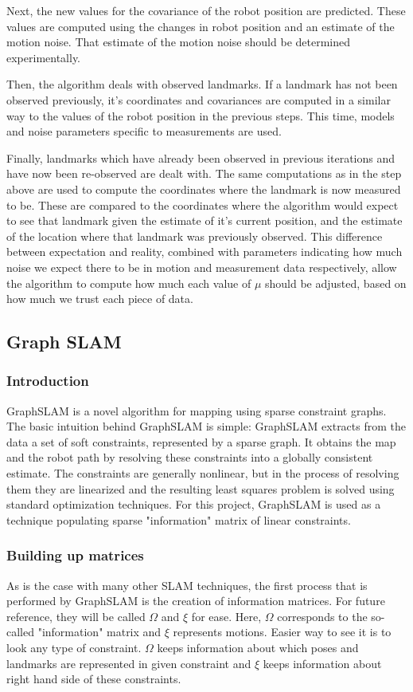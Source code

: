 \documentclass{ba-kecs}
\numberwithin{figure}{section}
\numberwithin{equation}{section}
\begin{document}
Next, the new values for the covariance of the robot position are predicted. These values are computed using the changes in robot position and an estimate of the motion noise. That estimate of the motion noise should be determined experimentally.

Then, the algorithm deals with observed landmarks. If a landmark has not been observed previously, it’s coordinates and covariances are computed in a similar way to the values of the robot position in the previous steps. This time, models and noise parameters specific to measurements are used.

Finally, landmarks which have already been observed in previous iterations and have now been re-observed are dealt with. The same computations as in the step above are used to compute the coordinates where the landmark is now measured to be. These are compared to the coordinates where the algorithm would expect to see that landmark given the estimate of it’s current position, and the estimate of the location where that landmark was previously observed. This difference between expectation and reality, combined with parameters indicating how much noise we expect there to be in motion and measurement data respectively, allow the algorithm to compute how much each value of $\mu$ should be adjusted, based on how much we trust each piece of data.

\subsection{Graph SLAM}

\subsubsection{Introduction}
GraphSLAM is a novel algorithm for mapping using sparse constraint graphs. The basic intuition behind GraphSLAM is simple: GraphSLAM extracts from the data a set of soft constraints, represented by a sparse graph. It obtains the map and the robot path by resolving these constraints into a globally consistent estimate. The constraints are generally nonlinear, but in the process of resolving them they are linearized and the resulting least squares problem is solved using standard optimization techniques\cite{sik}. For this project, GraphSLAM is used as a technique populating sparse "information" matrix of linear constraints.

\subsubsection{Building up matrices}
As is the case with many other SLAM techniques, the first process that is performed by GraphSLAM is the creation of information matrices. For future reference, they will be called $\Omega$ and $\xi$ for ease. Here, $\Omega$ corresponds to the so-called "information" matrix and $\xi$ represents motions. Easier way to see it is to look any type of constraint. $\Omega$ keeps information about which poses and landmarks are represented in given constraint and $\xi$ keeps information about right hand side of these constraints.
	
\end{document}
